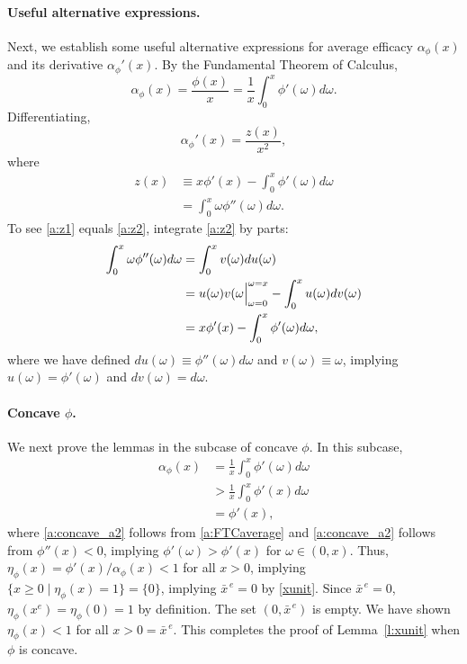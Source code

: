 \documentclass[12pt]{article}
\newcommand{\efficacy}{\phi}
\newcommand{\xunit}{x^{e}}
\newcommand{\xunitbar}{\bar{x}^{\,e}}
\newcommand{\elasticity}[1]{\eta_{#1}}
\newcommand{\perunit}[1]{\alpha_{#1}}
\begin{document}
\paragraph{Useful alternative expressions.} 

Next, we establish some useful alternative expressions for average
efficacy $\perunit{\efficacy}\!(x)$ and its derivative
$\perunit{\efficacy}'\!(x)$. By the Fundamental Theorem of Calculus,
\begin{equation}
\label{a:FTCaverage}
\perunit{\efficacy}\!(x) = \frac{\efficacy(x)}{x} = \frac{1}{x}
\int_0^x \efficacy'(\omega) d\omega.
\end{equation}
Differentiating, 
\begin{equation}
\label{a:perunit_prime}
\perunit{\efficacy}'\!(x) =\frac{z(x)}{x^2}, 
\end{equation}
where
\begin{align} 
z(x) & \equiv x \efficacy'(x) - \int_0^x \efficacy'(\omega) d\omega \label{a:z1} \\
& = \int_0^x \omega \efficacy''(\omega) d\omega. \label{a:z2}
\end{align}
To see \eqref{a:z1} equals \eqref{a:z2}, integrate \eqref{a:z2} by parts:
\begin{align}
\int_0^x \omega \efficacy''(\omega) d\omega & = \int_0^x v(\omega) du(\omega) \label{a:parts1} \\
& = \Bigl. u(\omega)v(\omega \Bigr|_{\omega=0}^{\omega=x} - \int_0^x u(\omega) dv(\omega) \label{a:parts2} \\
& = x \efficacy'(x) - \int_0^x \efficacy'(\omega) d\omega, \label{a:parts3}
\end{align}
where we have defined $du(\omega) \equiv \efficacy''(\omega) d\omega$
and $v(\omega) \equiv \omega$, implying $u(\omega) =
\efficacy'(\omega)$ and $dv(\omega) = d\omega$.

\paragraph{Concave $\efficacy$.} 

We next prove the lemmas in the subcase of concave $\efficacy$. In
this subcase,
\begin{align}
\perunit{\efficacy}\!(x) & = \frac{1}{x} \int_0^x \efficacy'(\omega) d\omega \label{a:concave_a1} \\
& > \frac{1}{x} \int_0^x \efficacy'(x) d\omega \label{a:concave_a2} \\
& = \efficacy'(x), \label{a:concave_a3}
\end{align}
where \eqref{a:concave_a2} follows from \eqref{a:FTCaverage} and
\eqref{a:concave_a2} follows from $\efficacy''(x) < 0$, implying
$\efficacy'(\omega) > \efficacy'(x)$ for $\omega \in (0,x)$. Thus,
$\elasticity{\efficacy} \!(x) = \efficacy'(x) /
\perunit{\efficacy}\!(x) < 1$ for all $x > 0$, implying $\{ x \geq 0
\mid \elasticity{\efficacy}\!(x) = 1 \} = \{ 0 \}$, implying $\xunitbar =
0$ by \eqref{xunit}. Since $\xunitbar = 0$,
$\elasticity{\efficacy}\!(\xunit) = \elasticity{\efficacy}\!(0) = 1$
by definition. The set $(0,\xunitbar)$ is empty. We have shown
$\elasticity{\efficacy}\!(x) < 1$ for all $x > 0 = \xunitbar$. This
completes the proof of Lemma~\ref{l:xunit} when $\efficacy$ is
concave.
\end{document}
